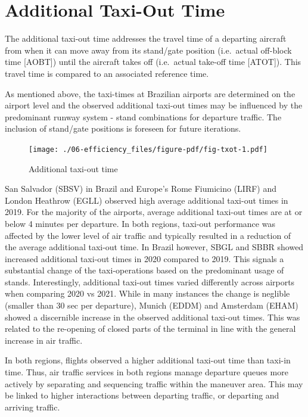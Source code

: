 \documentclass[
  a4paper,
  DIV=11,
  numbers=noendperiod]{scrreprt}
\begin{document}
\hypertarget{additional-taxi-out-time}{%
\section{Additional Taxi-Out Time}\label{additional-taxi-out-time}}

The additional taxi-out time addresses the travel time of a departing
aircraft from when it can move away from its stand/gate position
(i.e.~actual off-block time {[}AOBT{]}) until the aircraft takes off
(i.e.~actual take-off time {[}ATOT{]}). This travel time is compared to
an associated reference time.

As mentioned above, the taxi-times at Brazilian airports are determined
on the airport level and the observed additional taxi-out times may be
influenced by the predominant runway system - stand combinations for
departure traffic. The inclusion of stand/gate positions is foreseen for
future iterations.

\begin{figure}[h]

{\centering \texttt{[image: ./06-efficiency\_files/figure-pdf/fig-txot-1.pdf]}

}

\caption{\label{fig-txot}Additional taxi-out time}

\end{figure}

San Salvador (SBSV) in Brazil and Europe's Rome Fiumicino (LIRF) and
London Heathrow (EGLL) observed high average additional taxi-out times
in 2019. For the majority of the airports, average additional taxi-out
times are at or below 4 minutes per departure. In both regions, taxi-out
performance was affected by the lower level of air traffic and typically
resulted in a reduction of the average additional taxi-out time. In
Brazil however, SBGL and SBBR showed increased additional taxi-out times
in 2020 compared to 2019. This signals a substantial change of the
taxi-operations based on the predominant usage of stands. Interestingly,
additional taxi-out times varied differently across airports when
comparing 2020 vs 2021. While in many instances the change is neglible
(smaller than 30 sec per departure), Munich (EDDM) and Amsterdam (EHAM)
showed a discernible increase in the observed additional taxi-out times.
This was related to the re-opening of closed parts of the terminal in
line with the general increase in air traffic.

In both regions, flights observed a higher additional taxi-out time than
taxi-in time. Thus, air traffic services in both regions manage
departure queues more actively by separating and sequencing traffic
within the maneuver area. This may be linked to higher interactions
between departing traffic, or departing and arriving traffic.
\end{document}
